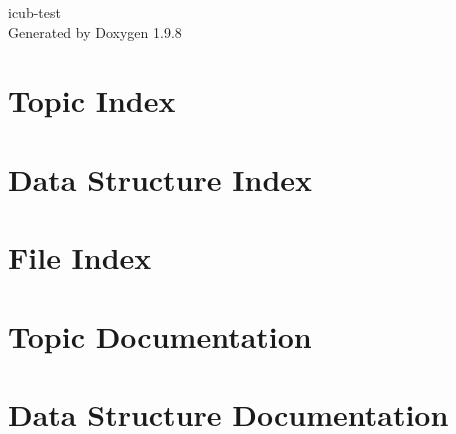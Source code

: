 \documentclass[twoside]{book}
\newcommand{\+}{\discretionary{\mbox{\scriptsize$\hookleftarrow$}}{}{}}
\newcommand{\clearemptydoublepage}{%
    \newpage{\pagestyle{empty}\cleardoublepage}%
  }
\begin{document}
  \raggedbottom
  \begin{titlepage}
  \vspace*{7cm}
  \begin{center}%
  {\Large icub-\/test}\\
  \vspace*{1cm}
  {\large Generated by Doxygen 1.9.8}\\
  \end{center}
  \end{titlepage}
  \clearemptydoublepage
  \tableofcontents
  \clearemptydoublepage









\chapter{Topic Index}

\chapter{Data Structure Index}

\chapter{File Index}

\chapter{Topic Documentation}

\chapter{Data Structure Documentation}






















\end{document}
